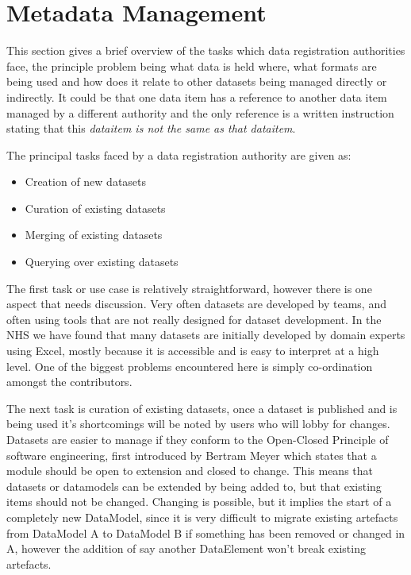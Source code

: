 \documentclass{llncs}
\begin{document}
\section{Metadata Management}
This section gives a brief overview of the tasks which data registration authorities face, the principle problem being what data is held where, what formats are being used and how does it relate to other datasets being managed directly or indirectly. It could be that one data item has a reference to another data item managed by a different authority and the only reference is a written instruction stating that this \emph{dataitem is not the same as that dataitem}. 

The principal tasks faced by a data registration authority are given as:
\begin{itemize}
\item Creation of new datasets
\item Curation of existing datasets
\item Merging of existing datasets
\item Querying over existing datasets
\end{itemize}

The first task or use case is relatively straightforward, however there is one aspect that needs discussion. Very often datasets are developed by teams, and often using tools that are not really designed for dataset development. In the NHS we have found that many datasets are initially developed by domain experts using Excel, mostly because it is accessible and is easy to interpret at a high level. One of the biggest problems encountered here is simply co-ordination amongst the contributors. 

The next task is curation of existing datasets, once a dataset is published and is being used it's shortcomings will be noted by users who will lobby for changes. Datasets are easier to manage if they conform to the Open-Closed Principle of software engineering, first introduced by Bertram Meyer \cite{Meyer} which states that a module should be open to extension and closed to change. This means that datasets or datamodels can be extended by being added to, but that existing items should not be changed. Changing is possible, but it implies the start of a completely new DataModel, since it is very difficult to migrate existing artefacts from DataModel A to DataModel B if something has been removed or changed in A, however the addition of say another DataElement won't break existing artefacts.
\end{document}

